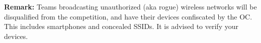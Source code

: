 \indent\textbf{Remark:} Teams broadcasting unauthorized (aka rogue) wireless networks will be disqualified from the competition, and have their devices confiscated by the OC.
This includes smartphones and concealed SSIDs.
It is advised to verify your devices.


